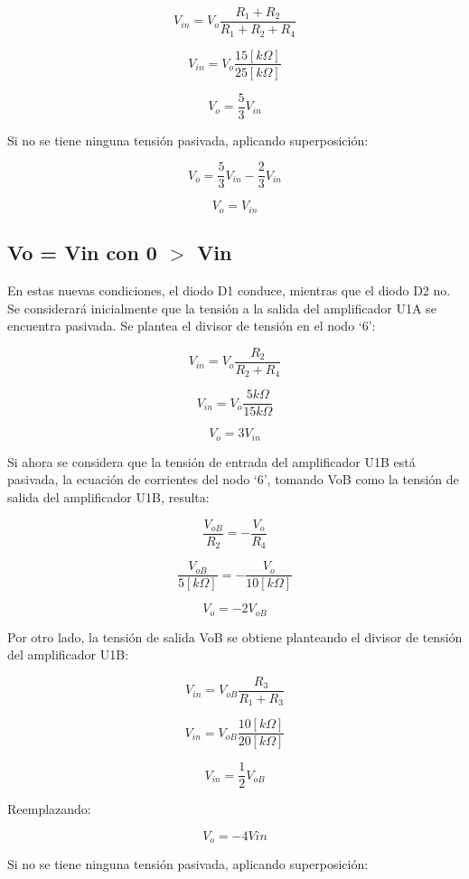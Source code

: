 \[V_{in} = V_o \frac{R_1+R_2}{R_1+R_2+R_4}\]

\[V_{in} = V_o \frac{15[k\Omega]}{25[k\Omega]}\]

\[V_o = \frac{5}{3}V_{in}\]

Si no se tiene ninguna tensión pasivada, aplicando superposición:

\[V_o = \frac{5}{3}V_{in} - \frac{2}{3}V_{in}\]

\[V_o = V_{in}\]


\subsection{Vo = Vin con 0 \texorpdfstring{$>$}{>} Vin}


En estas nuevas condiciones, el diodo D1 conduce, mientras que el diodo D2 no. Se considerará inicialmente que la tensión a la salida del amplificador U1A se encuentra pasivada. Se plantea el divisor de tensión en el nodo ‘6’:

\[V_{in} = V_o \frac{R_2}{R_2+R_4}\]

\[V_{in} = V_o \frac{5 k\Omega}{15 k\Omega }\]

\[V_o = 3V_{in}\]

Si ahora se considera que la tensión de entrada del amplificador U1B está pasivada, la ecuación de corrientes del nodo ‘6’, tomando VoB como la tensión de salida del amplificador U1B, resulta:

\begin{equation}
\frac{V_{oB}}{R_2} = - \frac{V_o}{R_4}
\end{equation}

\begin{equation}
\frac{V_{oB}}{5 [k\Omega]} = - \frac{V_o}{10 [k\Omega]}
\end{equation}

\begin{equation}
V_o = - 2V_{oB}
\end{equation}

Por otro lado, la tensión de salida VoB se obtiene planteando el divisor de tensión del amplificador U1B:

\[V_{in} = V_{oB} \frac{R_3}{R_1+R_3}\]

\[V_{in} = V_{oB} \frac{10 [k\Omega]}{20 [k\Omega]}\]

\[V_{in} = \frac{1}{2}V_{oB}\]

Reemplazando:

\[V_o = - 4V{in}\]

Si no se tiene ninguna tensión pasivada, aplicando superposición:

